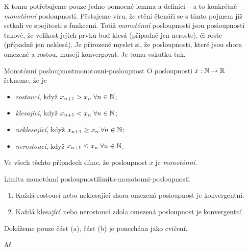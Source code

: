 K tomu potřebujeme pouze jedno pomocné lemma a definici -- a to konkrétně
\emph{monotónní} posloupnosti. Pěstujeme víru, že ctění čtenáři se s tímto
pojmem již setkali ve spojitosti s funkcemi. Totiž \emph{monotónní}
posloupnosti jsou posloupnosti takové, že velikost jejich prvků buď klesá
(případně jen neroste), či roste (případně jen neklesá). Je přirozené myslet si,
že posloupnosti, které jsou shora omezené a rostou, musejí konvergovat. Je tomu
vskutku tak.

\begin{definition}{Monotónní posloupnost}{monotonni-posloupnost}
 O posloupnosti $x:\mathbb{N} \to \mathbb{R}$ řekneme, že je
 \begin{itemize}
  \item \emph{rostoucí}, když $x_{n+1}>x_n \; \forall n \in \mathbb{N}$;
  \item \emph{klesající}, když $x_{n+1} < x_n \; \forall n \in \mathbb{N}$;
  \item \emph{neklesající}, když $x_{n+1} \geq x_n \; \forall n \in \mathbb{N}$;
  \item \emph{nerostoucí}, když $x_{n+1} \leq x_n \; \forall n \in \mathbb{N}$.
 \end{itemize}
 Ve všech těchto případech díme, že posloupnost $x$ je \emph{monotónní}.
\end{definition}

\begin{lemma}{Limita monotónní posloupnosti}{limita-monotonni-posloupnosti}
 \vspace*{-\parskip}
 \begin{enumerate}[label=(\alph*)]
  \item Každá rostoucí nebo neklesající shora omezená posloupnost je
   konvergentní.
  \item Každá klesající nebo nerostoucí zdola omezená posloupnost je
   konvergentní.
 \end{enumerate}
\end{lemma}
\begin{lemproof}
 Dokážeme pouze část (a), část (b) je ponechána jako cvičení.

 Ať 
\end{lemproof}


